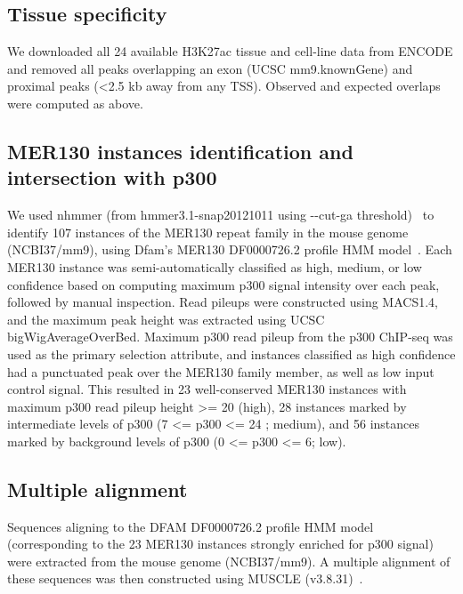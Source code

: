 \subsection{Tissue specificity}\label{tissue-specificity}

We downloaded all 24 available H3K27ac tissue and cell-line data from
ENCODE and removed all peaks overlapping an exon (UCSC mm9.knownGene)
and proximal peaks (\textless{}2.5 kb away from any TSS). Observed and
expected overlaps were computed as above.

\subsection{MER130 instances identification and intersection with
p300}\label{mer130-instances-identification-and-intersection-with-p300}

We used nhmmer (from hmmer3.1-snap20121011 using -\/-cut-ga threshold)~\citep{Wheeler:2013gj} to identify 107 instances of the MER130 repeat
family in the mouse genome (NCBI37/mm9), using Dfam's MER130 DF0000726.2
profile HMM model~\citep{Wheeler:2012im}. Each MER130 instance was
semi-automatically classified as high, medium, or low confidence based
on computing maximum p300 signal intensity over each peak, followed by
manual inspection. Read pileups were constructed using MACS1.4, and the
maximum peak height was extracted using UCSC bigWigAverageOverBed.
Maximum p300 read pileup from the p300 ChIP-seq was used as the primary
selection attribute, and instances classified as high confidence had a
punctuated peak over the MER130 family member, as well as low input
control signal. This resulted in 23 well-conserved MER130 instances with
maximum p300 read pileup height \textgreater{}= 20 (high), 28 instances
marked by intermediate levels of p300 (7 \textless{}= p300 \textless{}=
24 ; medium), and 56 instances marked by background levels of p300 (0
\textless{}= p300 \textless{}= 6; low).

\subsection{Multiple alignment}\label{multiple-alignment}

Sequences aligning to the DFAM DF0000726.2 profile HMM model
(corresponding to the 23 MER130 instances strongly enriched for p300
signal) were extracted from the mouse genome (NCBI37/mm9). A multiple
alignment of these sequences was then constructed using MUSCLE (v3.8.31)~\citep{Edgar:2004bo}.

